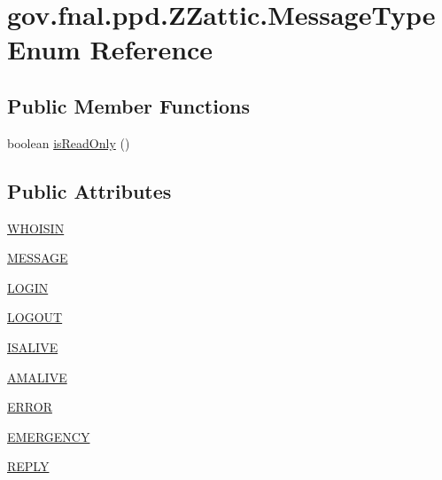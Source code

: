 \hypertarget{enumgov_1_1fnal_1_1ppd_1_1ZZattic_1_1MessageType}{\section{gov.\-fnal.\-ppd.\-Z\-Zattic.\-Message\-Type Enum Reference}
\label{enumgov_1_1fnal_1_1ppd_1_1ZZattic_1_1MessageType}
}
\subsection*{Public Member Functions}
\begin{DoxyCompactItemize}
\item 
boolean \hyperlink{enumgov_1_1fnal_1_1ppd_1_1ZZattic_1_1MessageType_af12ae0f8b82f8ffe3fdec70d55f4b00b}{is\-Read\-Only} ()
\end{DoxyCompactItemize}
\subsection*{Public Attributes}
\begin{DoxyCompactItemize}
\item 
\hyperlink{enumgov_1_1fnal_1_1ppd_1_1ZZattic_1_1MessageType_ac55125e923f4785bf34e29bd34d63052}{W\-H\-O\-I\-S\-I\-N}
\item 
\hyperlink{enumgov_1_1fnal_1_1ppd_1_1ZZattic_1_1MessageType_a81039ad567bff174746f349bf501288a}{M\-E\-S\-S\-A\-G\-E}
\item 
\hyperlink{enumgov_1_1fnal_1_1ppd_1_1ZZattic_1_1MessageType_a1b2eaec8a1967aa6a8ff031be5981193}{L\-O\-G\-I\-N}
\item 
\hyperlink{enumgov_1_1fnal_1_1ppd_1_1ZZattic_1_1MessageType_a30b69cd74904246b5e08ca7393f73280}{L\-O\-G\-O\-U\-T}
\item 
\hyperlink{enumgov_1_1fnal_1_1ppd_1_1ZZattic_1_1MessageType_a3e7f3ad40f9b156630088a33669d66fc}{I\-S\-A\-L\-I\-V\-E}
\item 
\hyperlink{enumgov_1_1fnal_1_1ppd_1_1ZZattic_1_1MessageType_a420f0982959f71b7899e7edee8625e43}{A\-M\-A\-L\-I\-V\-E}
\item 
\hyperlink{enumgov_1_1fnal_1_1ppd_1_1ZZattic_1_1MessageType_a367c7f63789c3a45808b4ddbd7fa28c6}{E\-R\-R\-O\-R}
\item 
\hyperlink{enumgov_1_1fnal_1_1ppd_1_1ZZattic_1_1MessageType_a8a6cc8f8eed3c874f5bdf50a2d257d99}{E\-M\-E\-R\-G\-E\-N\-C\-Y}
\item 
\hyperlink{enumgov_1_1fnal_1_1ppd_1_1ZZattic_1_1MessageType_abdccf8a588a0067210be6d65a361ca5e}{R\-E\-P\-L\-Y}
\end{DoxyCompactItemize}


